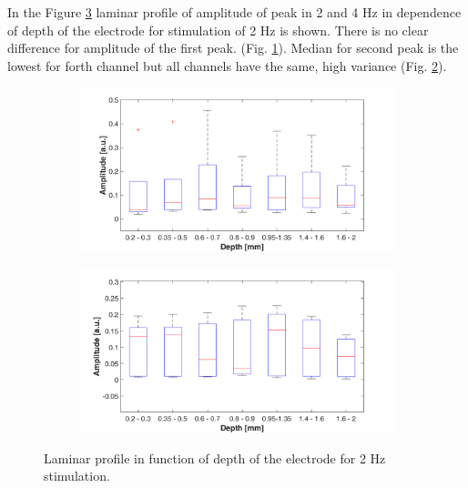 \documentclass{pracalicmgr}
\begin{document}
 In the Figure \ref{rys:profil_2Hz_wid} laminar profile of amplitude of peak in 2 and 4 Hz in dependence of depth of the electrode for stimulation of 2 Hz is shown. There is no clear difference for amplitude of the first peak. (Fig. \ref{rys:profil_2Hz_wid1}). Median for second peak is the lowest for forth channel but all channels have the same, high variance (Fig. \ref{rys:profil_2Hz_wid2}).
 
   	\begin{figure}[H]
  	\begin{subfigure}{.5\textwidth}
  		\centering
  		\includegraphics[width=1.\linewidth]{profile_2Hz_wid.png}
  		\caption{}
  		\label{rys:profil_2Hz_wid1}
  	\end{subfigure}%
  	\begin{subfigure}{.5\textwidth}
  		\centering
  		\includegraphics[width=1.\linewidth]{profile_2Hz_wid2.png}
  		\caption{}
  		\label{rys:profil_2Hz_wid2}
  	\end{subfigure}
  	
  	\caption{Laminar profile in function of depth of the electrode for 2 Hz stimulation.}
  	\label{rys:profil_2Hz_wid}
  \end{figure}
  
\end{document}
